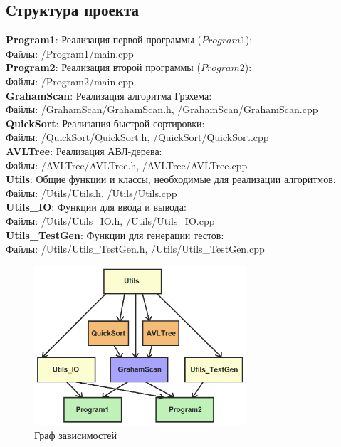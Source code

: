 \subsection{Структура проекта}
\noindent \textbf{Program1}: Реализация первой программы ($Program1$):\\
Файлы: /Program1/main.cpp\\
\noindent \textbf{Program2}: Реализация второй программы ($Program2$):\\
Файлы: /Program2/main.cpp\\
\noindent \textbf{GrahamScan}: Реализация алгоритма Грэхема:\\
Файлы: /GrahamScan/GrahamScan.h, /GrahamScan/GrahamScan.cpp\\
\noindent \textbf{QuickSort}: Реализация быстрой сортировки:\\
Файлы: /QuickSort/QuickSort.h, /QuickSort/QuickSort.cpp\\
\noindent \textbf{AVLTree}: Реализация АВЛ-дерева:\\
Файлы: /AVLTree/AVLTree.h, /AVLTree/AVLTree.cpp\\
\noindent \textbf{Utils}: Общие функции и классы, необходимые для реализации алгоритмов:\\
Файлы: /Utils/Utils.h, /Utils/Utils.cpp\\
\noindent \textbf{Utils\_IO}: Функции для ввода и вывода:\\
Файлы: /Utils/Utils\_IO.h, /Utils/Utils\_IO.cpp\\
\noindent \textbf{Utils\_TestGen}: Функции для генерации тестов:\\
Файлы: /Utils/Utils\_TestGen.h, /Utils/Utils\_TestGen.cpp\\

\begin{figure}[h]
	\centering
	\includegraphics[width=0.7\textwidth]{Images/project_structure.png}
	\caption{Граф зависимостей}
	\label{fig:project_structure}
\end{figure}

\newpage
